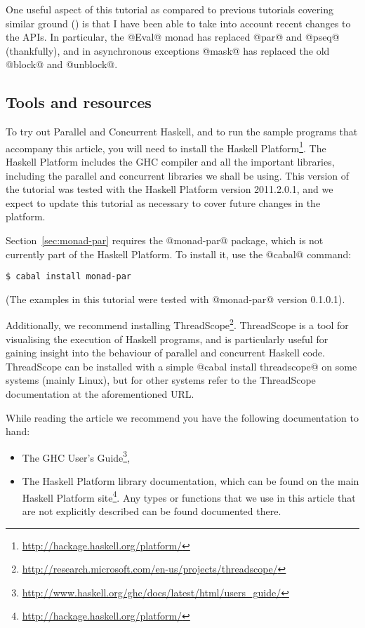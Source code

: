 \documentclass[11pt,a4paper]{article}
\let\cite=\citep
\newcommand{\Subsection}[2]{\subsection{#2}\label{sec:#1}}
\newcommand{\secref}[1]{Section~\ref{sec:#1}}
\begin{document}
One useful aspect of this tutorial as compared to previous tutorials
covering similar ground (\cite{awkward,pjsingh-tutorial}) is that I have been
able to take into account recent changes to the APIs.  In particular,
the @Eval@ monad has replaced @par@ and @pseq@ (thankfully), and in
asynchronous exceptions @mask@ has replaced the old @block@ and
@unblock@.

\Subsection{tools}{Tools and resources}

To try out Parallel and Concurrent Haskell, and to run the sample
programs that accompany this article, you will need to install the
Haskell Platform\footnote{\url{http://hackage.haskell.org/platform/}}.
The Haskell Platform includes the GHC compiler and all the important
libraries, including the parallel and concurrent libraries we shall be
using.  This version of the tutorial was tested with the Haskell
Platform version 2011.2.0.1, and we expect to update this tutorial as
necessary to cover future changes in the platform.

\secref{monad-par} requires the @monad-par@ package, which is not
currently part of the Haskell Platform.  To install it, use the
@cabal@ command:

{\small \begin{verbatim}
$ cabal install monad-par
\end{verbatim}}

\noindent (The examples in this tutorial were tested with @monad-par@ version 0.1.0.1).

Additionally, we recommend installing
ThreadScope\footnote{\url{http://research.microsoft.com/en-us/projects/threadscope/}}.
ThreadScope is a tool for visualising the execution of Haskell
programs, and is particularly useful for gaining insight into the
behaviour of parallel and concurrent Haskell code.  ThreadScope can be
installed with a simple @cabal install threadscope@ on some systems
(mainly Linux), but for other systems refer to the ThreadScope
documentation at the aforementioned URL.

While reading the article we recommend you have the following
documentation to hand:

\begin{itemize}
\item The GHC User's
  Guide\footnote{\url{http://www.haskell.org/ghc/docs/latest/html/users_guide/}},

\item The Haskell Platform library documentation, which can be found
  on the main Haskell Platform
  site\footnote{\url{http://hackage.haskell.org/platform/}}.  Any
  types or functions that we use in this article that are not
  explicitly described can be found documented there.
\end{itemize}
\end{document}
